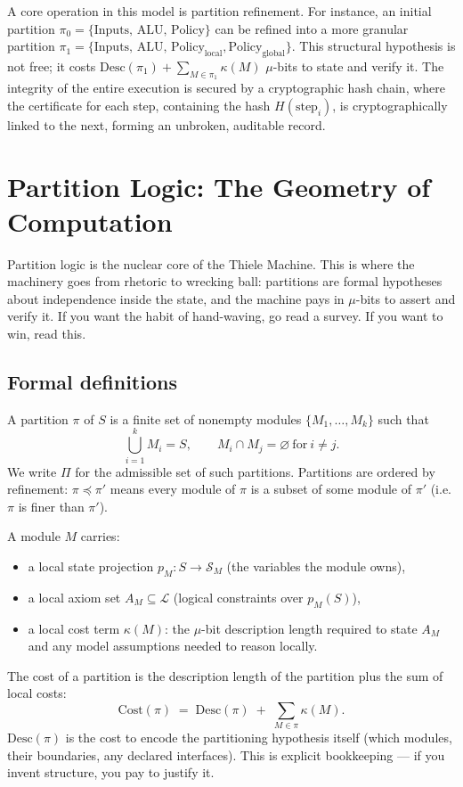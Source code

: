 \documentclass[11pt]{article}
\begin{document}
A core operation in this model is partition refinement. For instance, an initial partition $\pi_0 = \{\text{Inputs, ALU, Policy}\}$ can be refined into a more granular partition $\pi_1 = \{\text{Inputs, ALU, Policy}_{\text{local}}, \text{Policy}_{\text{global}}\}$. This structural hypothesis is not free; it costs $\mathrm{Desc}(\pi_1) + \sum_{M\in\pi_1}\kappa(M)$ $\mu$-bits to state and verify it. The integrity of the entire execution is secured by a cryptographic hash chain, where the certificate for each step, containing the hash $H(\text{step}_i)$, is cryptographically linked to the next, forming an unbroken, auditable record.

\section{Partition Logic: The Geometry of Computation}
Partition logic is the nuclear core of the Thiele Machine. This is where the machinery goes from rhetoric to wrecking ball: partitions are formal hypotheses about independence inside the state, and the machine pays in $\mu$-bits to assert and verify it. If you want the habit of hand-waving, go read a survey. If you want to win, read this.

\subsection{Formal definitions}
A partition $\pi$ of $S$ is a finite set of nonempty modules $\{M_1,\dots,M_k\}$ such that
\[
\bigcup_{i=1}^k M_i = S,\qquad M_i \cap M_j = \varnothing\ \text{for}\ i\neq j.
\]
We write $\Pi$ for the admissible set of such partitions. Partitions are ordered by refinement: $\pi \preceq \pi'$ means every module of $\pi$ is a subset of some module of $\pi'$ (i.e. $\pi$ is finer than $\pi'$).

A module $M$ carries:
\begin{itemize}
  \item a local state projection $p_M : S \to \mathcal{S}_M$ (the variables the module owns),
  \item a local axiom set $A_M \subseteq \mathcal{L}$ (logical constraints over $p_M(S)$),
  \item a local cost term $\kappa(M)$: the $\mu$-bit description length required to state $A_M$ and any model assumptions needed to reason locally.
\end{itemize}

The cost of a partition is the description length of the partition plus the sum of local costs:
\[
\mathrm{Cost}(\pi) \;=\; \mathrm{Desc}(\pi)\;+\;\sum_{M\in\pi}\kappa(M).
\]
$\mathrm{Desc}(\pi)$ is the cost to encode the partitioning hypothesis itself (which modules, their boundaries, any declared interfaces). This is explicit bookkeeping — if you invent structure, you pay to justify it.
\end{document}
